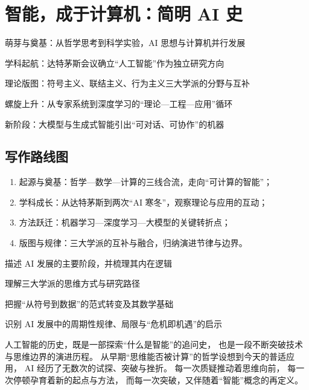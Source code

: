 
\chapter{智能，成于计算机：简明 AI 史}



\begin{introduction}  
  \item 萌芽与奠基：从哲学思考到科学实验，AI 思想与计算机并行发展
  \item 学科起航：达特茅斯会议确立“人工智能”作为独立研究方向
  \item 理论版图：符号主义、联结主义、行为主义三大学派的分野与互补
  \item 螺旋上升：从专家系统到深度学习的“理论—工程—应用”循环
  \item 新阶段：大模型与生成式智能引出“可对话、可协作”的机器
\end{introduction}

\section*{写作路线图}
\begin{enumerate}
  \item 起源与奠基：哲学—数学—计算的三线合流，走向“可计算的智能”；
  \item 学科成长：从达特茅斯到两次“AI 寒冬”，观察理论与应用的互动；
  \item 方法跃迁：机器学习—深度学习—大模型的关键转折点；
  \item 版图与规律：三大学派的互补与融合，归纳演进节律与边界。
\end{enumerate}

\begin{introduction}
  \item 描述 AI 发展的主要阶段，并梳理其内在逻辑
  \item 理解三大学派的思维方式与研究路径
  \item 把握“从符号到数据”的范式转变及其数学基础
  \item 识别 AI 发展中的周期性规律、局限与“危机即机遇”的启示
\end{introduction}

人工智能的历史，既是一部探索“什么是智能”的追问史，
也是一段不断突破技术与思维边界的演进历程。
从早期“思维能否被计算”的哲学设想到今天的普适应用，
AI 经历了无数次的试探、突破与挫折。  
每一次质疑推动着思维向前，
每一次停顿孕育着新的起点与方法，
而每一次突破，又伴随着“智能”概念的再定义。

